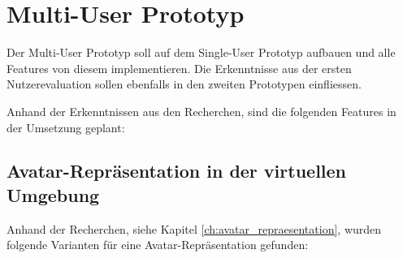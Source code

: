 \pagebreak
\section{Multi-User Prototyp}
Der Multi-User Prototyp soll auf dem Single-User Prototyp aufbauen und alle Features von diesem implementieren. Die Erkenntnisse aus der ersten Nutzerevaluation sollen ebenfalls in den zweiten Prototypen einfliessen.

Anhand der Erkenntnissen aus den Recherchen, sind die folgenden Features in der Umsetzung geplant:

\subsection{Avatar-Repräsentation in der virtuellen Umgebung}
\label{ch:avatar_repraesentation_realisierung}
Anhand der Recherchen, siehe Kapitel \ref{ch:avatar_repraesentation}, wurden folgende Varianten für eine Avatar-Repräsentation gefunden:
